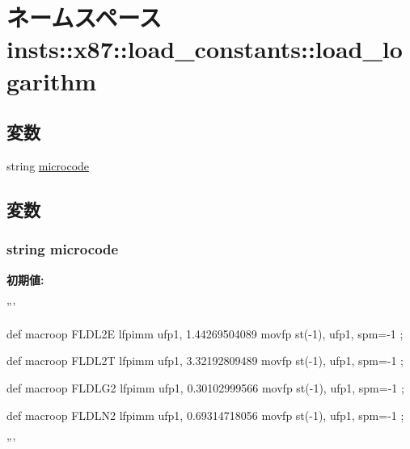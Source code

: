 \hypertarget{namespaceinsts_1_1x87_1_1load__constants_1_1load__logarithm}{
\section{ネームスペース insts::x87::load\_\-constants::load\_\-logarithm}
\label{namespaceinsts_1_1x87_1_1load__constants_1_1load__logarithm}
}
\subsection*{変数}
\begin{DoxyCompactItemize}
\item 
string \hyperlink{namespaceinsts_1_1x87_1_1load__constants_1_1load__logarithm_a770f11a173e99389a8802f0107ed8f52}{microcode}
\end{DoxyCompactItemize}


\subsection{変数}
\hypertarget{namespaceinsts_1_1x87_1_1load__constants_1_1load__logarithm_a770f11a173e99389a8802f0107ed8f52}{
\subsubsection[{microcode}]{\setlength{\rightskip}{0pt plus 5cm}string {\bf microcode}}}
\label{namespaceinsts_1_1x87_1_1load__constants_1_1load__logarithm_a770f11a173e99389a8802f0107ed8f52}
{\bfseries 初期値:}
\begin{DoxyCode}
'''

def macroop FLDL2E {
    lfpimm ufp1, 1.44269504089
    movfp st(-1), ufp1, spm=-1
};

def macroop FLDL2T {
    lfpimm ufp1, 3.32192809489
    movfp st(-1), ufp1, spm=-1
};

def macroop FLDLG2 {
    lfpimm ufp1, 0.30102999566
    movfp st(-1), ufp1, spm=-1
};

def macroop FLDLN2 {
    lfpimm ufp1, 0.69314718056
    movfp st(-1), ufp1, spm=-1
};

'''
\end{DoxyCode}
